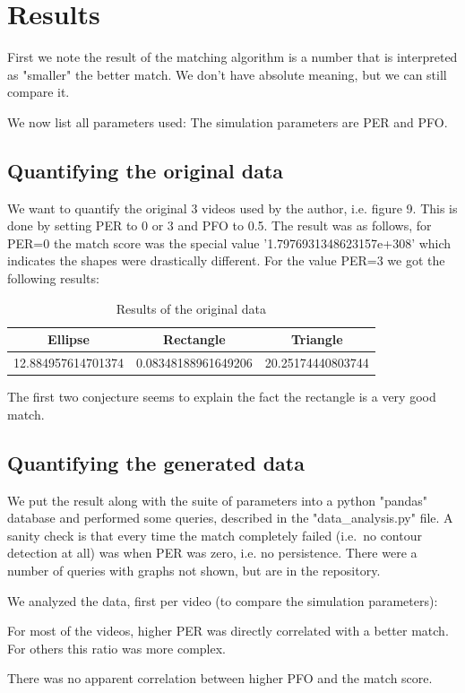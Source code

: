 \documentclass[]{article}
\begin{document}
\section{Results}
First we note the result of the matching algorithm is a number that is interpreted as "smaller" the better match. We don't have absolute meaning, but we can still compare it.

We now list all parameters used:
The simulation parameters are PER and PFO.
\subsection{Quantifying the original data}
We want to quantify the original 3 videos used by the author, i.e. figure 9. This is done by setting PER to 0 or 3 and PFO to 0.5. The result was as follows, for PER=0 the match score was the special value '1.7976931348623157e+308' which indicates the shapes were drastically different. For the value PER=3 we got the following results:
\begin{table}[h!]
	\centering
	\begin{tabular}{|c|c|c|}
		\hline
		Ellipse & Rectangle & Triangle \\
		\hline
		12.884957614701374 & 0.08348188961649206 & 20.25174440803744  \\
		\hline
	\end{tabular}
	\caption{Results of the original data}
	\label{fig:original_results}
\end{table}

The first two conjecture seems to explain the fact the rectangle is a very good match.
\subsection{Quantifying the generated data}
We put the result along with the suite of parameters into a python "pandas" database and performed some queries, described in the "data\_analysis.py" file. A sanity check is that every time the match completely failed (i.e.\ no contour detection at all) was when PER was zero, i.e. no persistence. 
There were a number of queries with graphs not shown, but are in the repository.

We analyzed the data, first per video (to compare the simulation parameters):

For most of the videos, higher PER was directly correlated with a better match. For others this ratio was more complex.

There was no apparent correlation between higher PFO and the match score.
\end{document}
